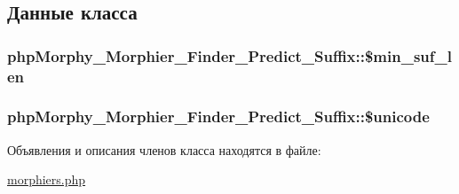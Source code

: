 \subsection{Данные класса}
\hypertarget{classphpMorphy__Morphier__Finder__Predict__Suffix_ac18bf50b02a7f1079d1ef691e2f350ef}{
\subsubsection[{\$min\_\-suf\_\-len}]{\setlength{\rightskip}{0pt plus 5cm}phpMorphy\_\-Morphier\_\-Finder\_\-Predict\_\-Suffix::\$min\_\-suf\_\-len}}
\label{classphpMorphy__Morphier__Finder__Predict__Suffix_ac18bf50b02a7f1079d1ef691e2f350ef}
\hypertarget{classphpMorphy__Morphier__Finder__Predict__Suffix_a48f5fe6dcb076453a2aaefafcc6eaf97}{
\subsubsection[{\$unicode}]{\setlength{\rightskip}{0pt plus 5cm}phpMorphy\_\-Morphier\_\-Finder\_\-Predict\_\-Suffix::\$unicode}}
\label{classphpMorphy__Morphier__Finder__Predict__Suffix_a48f5fe6dcb076453a2aaefafcc6eaf97}


Объявления и описания членов класса находятся в файле:\begin{DoxyCompactItemize}
\item 
\hyperlink{morphiers_8php}{morphiers.php}\end{DoxyCompactItemize}
